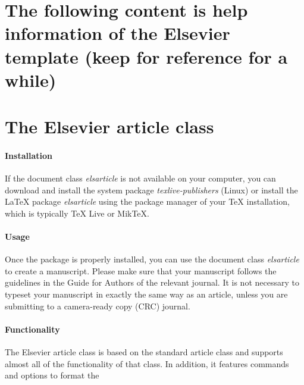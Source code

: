 \documentclass[]{elsarticle} %
\begin{document}
\hypertarget{the-following-content-is-help-information-of-the-elsevier-template-keep-for-reference-for-a-while}{%
\section{The following content is help information of the Elsevier
template (keep for reference for a
while)}\label{the-following-content-is-help-information-of-the-elsevier-template-keep-for-reference-for-a-while}}

\hypertarget{the-elsevier-article-class}{%
\section{The Elsevier article class}\label{the-elsevier-article-class}}

\hypertarget{installation}{%
\paragraph{Installation}\label{installation}}

If the document class \emph{elsarticle} is not available on your
computer, you can download and install the system package
\emph{texlive-publishers} (Linux) or install the LaTeX package
\emph{elsarticle} using the package manager of your TeX installation,
which is typically TeX Live or MikTeX.

\hypertarget{usage}{%
\paragraph{Usage}\label{usage}}

Once the package is properly installed, you can use the document class
\emph{elsarticle} to create a manuscript. Please make sure that your
manuscript follows the guidelines in the Guide for Authors of the
relevant journal. It is not necessary to typeset your manuscript in
exactly the same way as an article, unless you are submitting to a
camera-ready copy (CRC) journal.

\hypertarget{functionality}{%
\paragraph{Functionality}\label{functionality}}

The Elsevier article class is based on the standard article class and
supports almost all of the functionality of that class. In addition, it
features commands and options to format the
\end{document}
